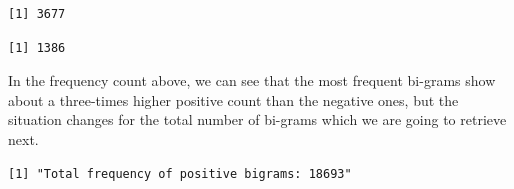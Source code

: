 \begin{Shaded}
\begin{Highlighting}[]
\OtherTok{\textless{}{-}} \SpecialCharTok{$}\NormalTok{freq[}\SpecialCharTok{:}\NormalTok{])}
\OtherTok{\textless{}{-}} \SpecialCharTok{$}\NormalTok{freq[}\SpecialCharTok{:}\NormalTok{])}

\end{Highlighting}
\end{Shaded}

\begin{verbatim}
[1] 3677
\end{verbatim}

\begin{Shaded}
\begin{Highlighting}[]
\end{Highlighting}
\end{Shaded}

\begin{verbatim}
[1] 1386
\end{verbatim}

In the frequency count above, we can see that the most frequent bi-grams
show about a three-times higher positive count than the negative ones,
but the situation changes for the total number of bi-grams which we are going to
retrieve next.

\begin{Shaded}
\begin{Highlighting}[]
\OtherTok{\textless{}{-}} \SpecialCharTok{$}
\OtherTok{\textless{}{-}} \SpecialCharTok{$}

\NormalTok{(}\NormalTok{(}
\end{Highlighting}
\end{Shaded}

\begin{verbatim}
[1] "Total frequency of positive bigrams: 18693"
\end{verbatim}

